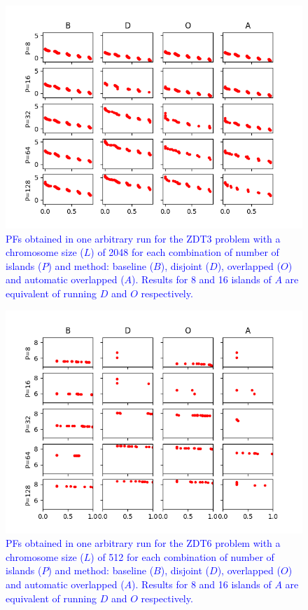 \documentclass[preprint]{elsarticle}
\begin{document}
\begin{figure}
\centering
\includegraphics[width=12cm]{plot_zdt3_2048.png}
\caption{\textcolor{blue}{PFs obtained in one arbitrary run for the ZDT3 problem with a chromosome size ($L$) of 2048 for each combination of number of islands ($P$) and method: baseline ($B$), disjoint ($D$), overlapped ($O$) and automatic overlapped ($A$). Results for 8 and 16 islands of $A$ are equivalent of running $D$ and $O$ respectively. }}
\label{fig:plot_zdt3_2048}
\end{figure}




\begin{figure}
\centering
\includegraphics[width=12cm]{plot_zdt6_512.png}
\caption{\textcolor{blue}{PFs obtained in one arbitrary run for the ZDT6 problem with a chromosome size ($L$) of 512 for each combination of number of islands ($P$) and method: baseline ($B$), disjoint ($D$), overlapped ($O$) and automatic overlapped ($A$). Results for 8 and 16 islands of $A$ are equivalent of running $D$ and $O$ respectively. }}
\label{fig:plot_zdt6_512}
\end{figure}
\end{document}
